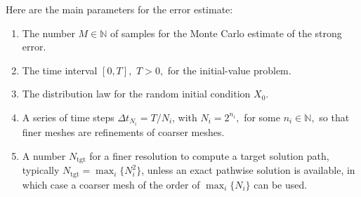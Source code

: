 \documentclass[reqno,12pt]{amsart}
\theoremstyle{plain} %
\theoremstyle{definition} %
\begin{document}
Here are the main parameters for the error estimate:
\begin{enumerate}
    \item The number $M\in\mathbb{N}$ of samples for the Monte Carlo estimate of the strong error.
    \item The time interval $[0, T], $ $T > 0,$ for the initial-value problem.
    \item The distribution law for the random initial condition $X_0$.
    \item A series of time steps $\Delta t_{N_i} = T/N_i$, with $N_i=2^{n_i},$ for some $n_i\in\mathbb{N},$ so that finer meshes are refinements of coarser meshes.
    \item A number $N_{\mathrm{tgt}}$ for a finer resolution to compute a target solution path, typically $N_{\mathrm{tgt}} = \max_i\{N_i^2\}$, unless an exact pathwise solution is available, in which case a coarser mesh of the order of $\max_i\{N_i\}$ can be used.
\end{enumerate}
\end{document}
